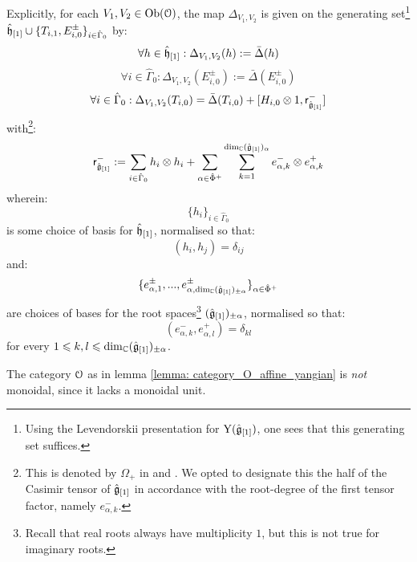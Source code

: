 \begin{lemma}
            Explicitly, for each $V_1, V_2 \in \mathrm{Ob}(\mathcal{O})$, the map $\Delta_{V_1, V_2}$ is given on the generating set\footnote{Using the Levendorskii presentation for $\mathrm{Y}(\hat{\mathfrak{g}}_{[1]})$, one sees that this generating set suffices.} $\hat{\mathfrak{h}}_{[1]} \cup \{T_{i, 1}, E_{i, 0}^{\pm}\}_{i \in \hat{\Gamma}_0}$ by:
                $$\forall h \in \hat{\mathfrak{h}}_{[1]}: \Delta_{V_1, V_2}(h) := \bar{\Delta}(h)$$
                $$\forall i \in \hat{\Gamma}_0: \Delta_{V_1, V_2}(E_{i, 0}^{\pm}) := \bar{\Delta}(E_{i, 0}^{\pm})$$
                $$\forall i \in \hat{\Gamma}_0: \Delta_{V_1, V_2}(T_{i, 0}) = \bar{\Delta}(T_{i, 0}) + [H_{i, 0} \tensor 1, \sfr_{ \hat{\g}_{[1]} }^-]$$
            with\footnote{This is denoted by $\Omega_+$ in \cite{guay_nakajima_wendlandt_affine_yangian_coproduct} and \cite{guay_nakajima_wendlandt_affine_yangian_vertex_representations_and_PBW}. We opted to designate this the  half of the Casimir tensor of $\hat{\mathfrak{g}}_{[1]}$ in accordance with the root-degree of the first tensor factor, namely $e_{\alpha, k}^-$.}:
                $$\sfr_{ \hat{\g}_{[1]} }^- := \sum_{i \in \hat{\Gamma}_0} h_i \tensor h_i + \sum_{\alpha \in \hat{\Phi}^+} \sum_{k = 1}^{ \dim_{\bbC} (\hat{\g}_{[1]})_{\alpha} } e_{\alpha, k}^- \tensor e_{\alpha, k}^+$$
            wherein:
                $$\{h_i\}_{i \in \hat{\Gamma}_0}$$
            is some choice of basis for $\hat{\mathfrak{h}}_{[1]}$, normalised so that:
                $$(h_i, h_j) = \delta_{ij}$$
            and:
                $$\{ e_{\alpha, 1}^{\pm}, ..., e_{\alpha, \dim_{\mathbb{C}} (\hat{\mathfrak{g}}_{[1]})_{\pm \alpha}}^{\pm} \}_{\alpha \in \hat{\Phi}^+}$$
            are choices of bases for the root spaces\footnote{Recall that real roots always have multiplicity $1$, but this is not true for imaginary roots.} $(\hat{\mathfrak{g}}_{[1]})_{\pm\alpha}$, normalised so that:
                $$(e_{\alpha, k}^-, e_{\alpha, l}^+) = \delta_{kl}$$
            for every $1 \leqslant k, l \leqslant \dim_{\mathbb{C}} (\hat{\mathfrak{g}}_{[1]})_{\pm\alpha}$.
        \end{lemma}
        \begin{remark}
            The category $\mathcal{O}$ as in lemma \ref{lemma: category_O_affine_yangian} is \textit{not} monoidal, since it lacks a monoidal unit. 
        \end{remark}
